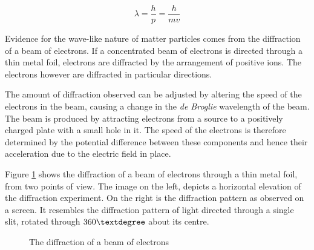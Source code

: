 \documentclass[12pt]{article}
\begin{document}
\[ \lambda  = \dfrac{h}{p} = \dfrac{h}{mv}\]

Evidence for the wave-like nature of matter particles comes from the diffraction of a beam of electrons. If a concentrated beam of electrons is directed through a thin metal foil, electrons are diffracted by the arrangement of positive ions. The electrons however are diffracted in particular directions.

The amount of diffraction observed can be adjusted by altering the speed of the electrons in the beam, causing a change in the \emph{de Broglie} wavelength of the beam. The beam is produced by attracting electrons from a source to a positively charged plate with a small hole in it. The speed of the electrons is therefore determined by the potential difference between these components and hence their acceleration due to the electric field in place.

Figure \ref{img:electron_diffraction} shows the diffraction of a beam of electrons through a thin metal foil, from two points of view. The image on the left, depicts a horizontal elevation of the diffraction experiment. On the right is the diffraction pattern as observed on a screen. It resembles the diffraction pattern of light directed through a single slit, rotated through \(360 \textdegree\) about its centre.

\begin{figure}[H]
\centering
\begin{minipage}{.45\textwidth}
\centering
{}
\end{minipage}
\begin{minipage}{.45\textwidth}
\centering
{}
\end{minipage}
\caption{The diffraction of a beam of electrons}
\label{img:electron_diffraction}
\end{figure}
\end{document}
